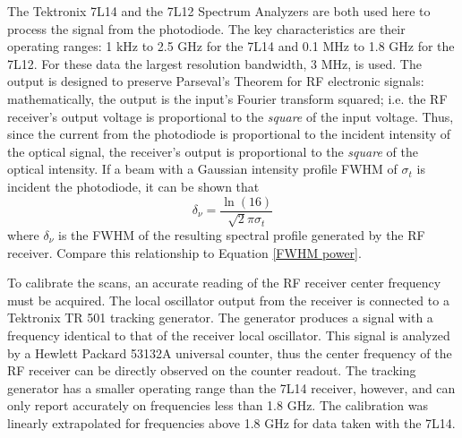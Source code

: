 The Tektronix 7L14 and the 7L12 Spectrum Analyzers are both used here to process the signal from the photodiode. The key characteristics are their operating ranges: 1 kHz to 2.5 GHz for the 7L14 and 0.1 MHz to 1.8 GHz for the 7L12. For these data the largest resolution bandwidth, 3 MHz, is used. The output is designed to preserve Parseval's Theorem for RF electronic signals: mathematically, the output is the input's Fourier transform squared; i.e. the RF receiver's output voltage is proportional to the \emph{square} of the input voltage. Thus, since the current from the photodiode is proportional to the incident intensity of the optical signal, the receiver's output is proportional to the \emph{square} of the optical intensity. If a beam with a Gaussian intensity profile FWHM of $\sigma_t$ is incident the photodiode, it can be shown that 
\begin{equation}
\delta_{\nu}
=
\frac
{\ln(16)}
{\sqrt{2}\pi\sigma_t}
\label{receiver width}
\end{equation}
where $\delta_{\nu}$ is the FWHM of the resulting spectral profile generated by the RF receiver. Compare this relationship to Equation \ref{FWHM power}.

To calibrate the scans, an accurate reading of the RF receiver center frequency must be acquired. The local oscillator output from the receiver is connected to a Tektronix TR 501 tracking generator. The generator produces a signal with a frequency identical to that of the receiver local oscillator. This signal is analyzed by a Hewlett Packard 53132A universal counter, thus the center frequency of the RF receiver can be directly observed on the counter readout. The tracking generator has a smaller operating range than the 7L14 receiver, however, and can only report accurately on frequencies less than 1.8 GHz. The calibration was linearly extrapolated for frequencies above 1.8 GHz for data taken with the 7L14.

